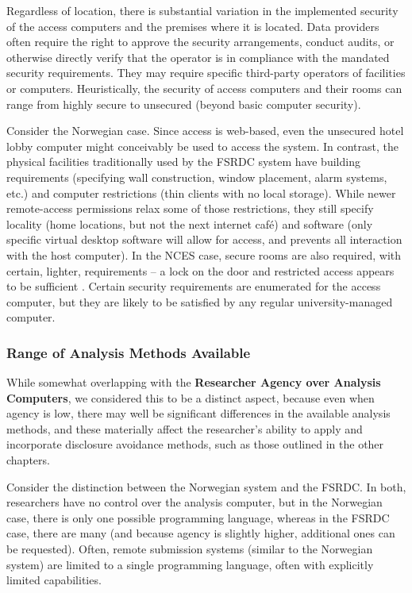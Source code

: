 Regardless of location, there is substantial variation in the implemented security of the access computers and the premises where it is located.  Data providers often require the right to approve the security arrangements, conduct audits, or otherwise directly verify that the operator is in compliance with the mandated security requirements. They may require specific third-party operators of facilities or computers. Heuristically, the security of access computers and their rooms can range from highly secure to unsecured (beyond basic computer security).

Consider the Norwegian case. Since access is web-based, even the unsecured hotel lobby computer might conceivably be used to access the system. In contrast, the physical facilities traditionally used by the FSRDC system have building requirements (specifying wall construction, window placement, alarm systems, etc.) and computer restrictions (thin clients with no local storage). While newer remote-access permissions relax some of those restrictions, they still specify locality (home locations, but not the next internet café) and software (only specific virtual desktop software will allow for access, and prevents all interaction with the host computer). In the NCES case, secure rooms are also required, with certain, lighter, requirements -- a lock on the door and restricted access appears to be sufficient \cite{national_center_for_education_statistics_appendix_nodate}. Certain security requirements are enumerated for the access computer, but they are likely to be satisfied by any regular university-managed computer.

\subsubsection{Range of Analysis Methods Available}

While somewhat overlapping with the \textbf{Researcher Agency over Analysis Computers}, we considered this to be a distinct aspect, because even when agency is low, there may well be significant differences in the available analysis methods, and these materially affect the researcher's ability to apply and incorporate disclosure avoidance methods, such as those outlined in the other chapters. 

Consider the distinction between the Norwegian system and the FSRDC. In both, researchers have no control over the analysis computer, but in the Norwegian case, there is only one possible programming language, whereas in the FSRDC case, there are many (and because agency is slightly higher, additional ones can be requested). Often, remote submission systems (similar to the Norwegian system) are limited to a single programming language, often with explicitly limited capabilities. 

